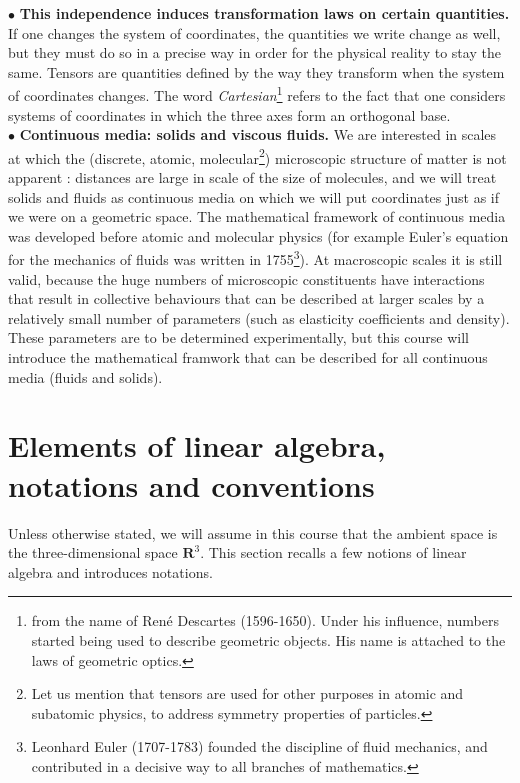 \documentclass[DIV=12]{article}
\begin{document}
  
$\bullet$ {\bf{This independence induces transformation laws on certain quantities.}}
 If one changes the system of coordinates, the quantities we write change as 
well, but they must do so in a precise way in order for the physical reality to stay the same.
 Tensors are quantities defined by the way they transform when the system of coordinates changes.
 The word {\emph{Cartesian}}\footnote{from the name of Ren\'e Descartes (1596-1650). Under his influence,
 numbers started being used to describe geometric objects. His name is attached to the laws of geometric optics.} refers to the fact that one considers systems of coordinates in which the three axes form an orthogonal base.\\


$\bullet$ {\bf{Continuous media: solids and viscous fluids.}} We are interested in 
 scales at which the (discrete, atomic, molecular\footnote{Let us mention that tensors are used
 for other purposes in atomic and subatomic physics, to address symmetry properties of particles.}) microscopic structure of matter is not apparent :
 distances are large in scale of the size of molecules, and
 we will treat solids and fluids as continuous media on which we will put coordinates just as if we were
 on a geometric space. The mathematical framework 
 of continuous media was developed before  atomic and molecular physics (for example Euler's equation for the mechanics of fluids was written in 1755\footnote{Leonhard Euler (1707-1783) founded the discipline of fluid mechanics, and contributed in a 
decisive way to all branches of mathematics.}).
 At macroscopic scales it is still valid, because the huge numbers of microscopic constituents
 have interactions that result in collective behaviours that can be described at larger scales
 by a relatively small number of parameters (such as elasticity coefficients and density). These
 parameters are to be determined experimentally, but this course will introduce the mathematical 
framwork that can be described for all continuous media (fluids and solids).





\section{Elements of linear algebra, notations and conventions}
Unless otherwise stated, we will assume in this course that the ambient space
 is  the three-dimensional space $\mathbf{R}^3$. This section 
 recalls a few notions of linear algebra and introduces notations.\\
\end{document}
